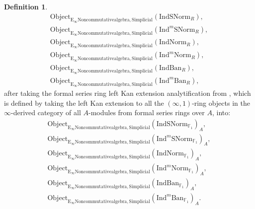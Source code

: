 \documentclass[11pt]{book}
\theoremstyle{definition}
\newtheorem{definition}[theorem]{Definition}
\numberwithin{equation}{section}
\begin{document}
\begin{definition}
\begin{align}
\mathrm{Object}_{\mathrm{E}_\infty\mathrm{Noncommutativealgebra},\mathrm{Simplicial}}(\mathrm{IndSNorm}_R),\\
\mathrm{Object}_{\mathrm{E}_\infty\mathrm{Noncommutativealgebra},\mathrm{Simplicial}}(\mathrm{Ind}^m\mathrm{SNorm}_R),\\
\mathrm{Object}_{\mathrm{E}_\infty\mathrm{Noncommutativealgebra},\mathrm{Simplicial}}(\mathrm{IndNorm}_R),\\
\mathrm{Object}_{\mathrm{E}_\infty\mathrm{Noncommutativealgebra},\mathrm{Simplicial}}(\mathrm{Ind}^m\mathrm{Norm}_R),\\
\mathrm{Object}_{\mathrm{E}_\infty\mathrm{Noncommutativealgebra},\mathrm{Simplicial}}(\mathrm{IndBan}_R),\\
\mathrm{Object}_{\mathrm{E}_\infty\mathrm{Noncommutativealgebra},\mathrm{Simplicial}}(\mathrm{Ind}^m\mathrm{Ban}_R),
\end{align}
after taking the formal series ring left Kan extension analytification from \cite[Section 4.2]{BBM}, which is defined by taking the left Kan extension to all the $(\infty,1)$-ring objects in the $\infty$-derived category of all $A$-modules from formal series rings over $A$, into:
\begin{align}
\mathrm{Object}_{\mathrm{E}_\infty\mathrm{Noncommutativealgebra},\mathrm{Simplicial}}(\mathrm{IndSNorm}_{\mathbb{F}_1})_A,\\
\mathrm{Object}_{\mathrm{E}_\infty\mathrm{Noncommutativealgebra},\mathrm{Simplicial}}(\mathrm{Ind}^m\mathrm{SNorm}_{\mathbb{F}_1})_A,\\
\mathrm{Object}_{\mathrm{E}_\infty\mathrm{Noncommutativealgebra},\mathrm{Simplicial}}(\mathrm{IndNorm}_{\mathbb{F}_1})_A,\\
\mathrm{Object}_{\mathrm{E}_\infty\mathrm{Noncommutativealgebra},\mathrm{Simplicial}}(\mathrm{Ind}^m\mathrm{Norm}_{\mathbb{F}_1})_A,\\
\mathrm{Object}_{\mathrm{E}_\infty\mathrm{Noncommutativealgebra},\mathrm{Simplicial}}(\mathrm{IndBan}_{\mathbb{F}_1})_A,\\
\mathrm{Object}_{\mathrm{E}_\infty\mathrm{Noncommutativealgebra},\mathrm{Simplicial}}(\mathrm{Ind}^m\mathrm{Ban}_{\mathbb{F}_1})_A.
\end{align}
\end{definition}


\
\end{document}
